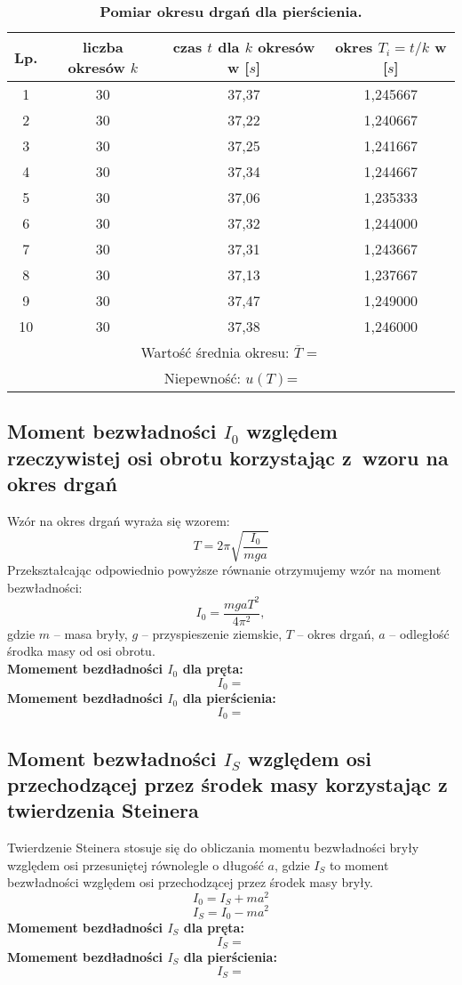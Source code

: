 \documentclass[a4paper,11pt]{article}
\begin{document}
\begin{table}[ht]
\centering
\setlength{\extrarowheight}{2pt}
\caption{\textbf{Pomiar okresu drgań dla pierścienia.}}
\begin{tabular}{|c|c|c|c|}
\hline
Lp. & liczba okresów $k$ & czas $t$ dla $k$ okresów w [$s$] & okres $T_{i}=t/k$ w [$s$] \\ \hline
1 & 30 & 37,37 & 1,245667\\ \hline
2 & 30 & 37,22 & 1,240667\\ \hline
3 & 30 & 37,25 & 1,241667\\ \hline
4 & 30 & 37,34 & 1,244667\\ \hline
5 & 30 & 37,06 & 1,235333\\ \hline
6 & 30 & 37,32 & 1,244000\\ \hline
7 & 30 & 37,31 & 1,243667\\ \hline
8 & 30 & 37,13 & 1,237667\\ \hline
9 & 30 & 37,47 & 1,249000\\ \hline
10 & 30 & 37,38 & 1,246000\\ \hline
\multicolumn{4}{|c|}{Wartość średnia okresu: $\overline{T}= $} \\ \hline
\multicolumn{4}{|c|}{Niepewność: $u(T)$=} \\ \hline
\end{tabular}
\end{table}

\subsection{Moment bezwładności $I_{0}$ względem rzeczywistej osi obrotu korzystając z~wzoru na okres drgań}
Wzór na okres drgań wyraża się wzorem:
$$T=2\pi\sqrt{\dfrac{I_{0}}{mga}}$$
Przekształcając odpowiednio powyższe równanie otrzymujemy wzór na moment bezwładności:
$$I_{0}=\dfrac{mgaT^{2}}{4\pi^{2}},$$
gdzie $m$ -- masa bryły, $g$ -- przyspieszenie ziemskie, $T$ -- okres drgań, $a$ -- odległość środka masy od osi obrotu.
$$$$
\textbf{Momement bezdładności $I_{0}$ dla pręta:}
$$I_{0} = $$
\textbf{Momement bezdładności $I_{0}$ dla pierścienia:
}$$I_{0} = $$

\subsection{Moment bezwładności $I_{S}$ względem osi przechodzącej przez środek masy korzystając z twierdzenia Steinera}
Twierdzenie Steinera stosuje się do obliczania momentu bezwładności bryły względem osi przesuniętej równolegle o długość $a$, gdzie $I_{S}$ to moment bezwładności względem osi przechodzącej przez środek masy bryły.
$$I_{0}=I_{S}+ma^{2}$$
$$I_{S}=I_{0}-ma^{2}$$
\textbf{Momement bezdładności $I_{S}$ dla pręta:
}$$I_{S} = $$
\textbf{Momement bezdładności $I_{S}$ dla pierścienia:
}$$I_{S} = $$
\end{document}
